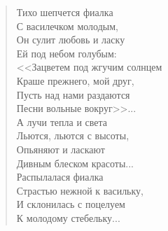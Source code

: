 \newpage
\vspace*{0cm}


\begin{verse}
\begin{altverse}
Тихо шепчется фиалка\\
    С василечком молодым,\\
Он сулит любовь и ласку\\
    Ей под небом голубым:\\
<<Зацветем под жгучим солнцем\\
    Краше прежнего, мой друг,\\
Пусть над нами раздаются\\
    Песни вольные вокруг>>...\\
А лучи тепла и света\\
    Льются, льются с высоты,\\
Опьяняют и ласкают\\
    Дивным блеском красоты...\\
Распылалася фиалка\\
    Страстью нежной к васильку,\\
И склонилась с поцелуем\\
    К молодому стебельку...\\
\end{altverse}
\end{verse}


\newpage
\vspace*{0cm}


